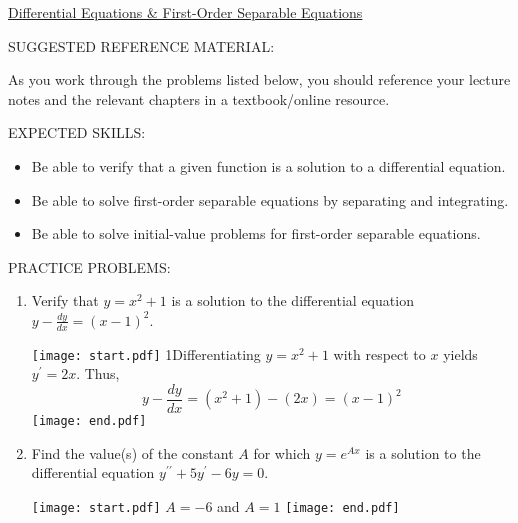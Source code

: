 \documentclass[12pt]{article}
\begin{document}
\begin{center}
\underline{\LARGE{Differential Equations \& First-Order Separable Equations}}
\end{center}

\noindent SUGGESTED REFERENCE MATERIAL:

\medskip

\noindent As you work through the problems listed below, you should reference your lecture notes and the relevant chapters in a textbook/online resource.

\bigskip

\noindent EXPECTED SKILLS:

\medskip

\begin{itemize}[topsep=0pt]

\item Be able to verify that a given function is a solution to a differential equation.

\item Be able to solve first-order separable equations by separating and integrating.

\item Be able to solve initial-value problems for first-order separable equations. 

\end{itemize}

\bigskip

\noindent PRACTICE PROBLEMS:

\begin{enumerate}

\item Verify that $y=x^2+1$ is a solution to the differential equation $y-\frac{dy}{dx}=(x-1)^2$.

\texttt{[image: start.pdf]}
{{{1\linewidth}{Differentiating $y=x^2+1$ with respect to $x$ yields $y^{\prime}=2x$.  Thus,\\
 $$y-\frac{dy}{dx}=(x^2+1)-(2x)=(x-1)^2$$}}}
\texttt{[image: end.pdf]}


\item Find the value(s) of the constant $A$ for which $y=e^{Ax}$ is a solution to the differential equation $y^{\prime\prime}+5y^{\prime}-6y=0$.

\texttt{[image: start.pdf]}
{{$A=-6$ and $A=1$}}
\texttt{[image: end.pdf]}


\end{enumerate}

\end{document}
